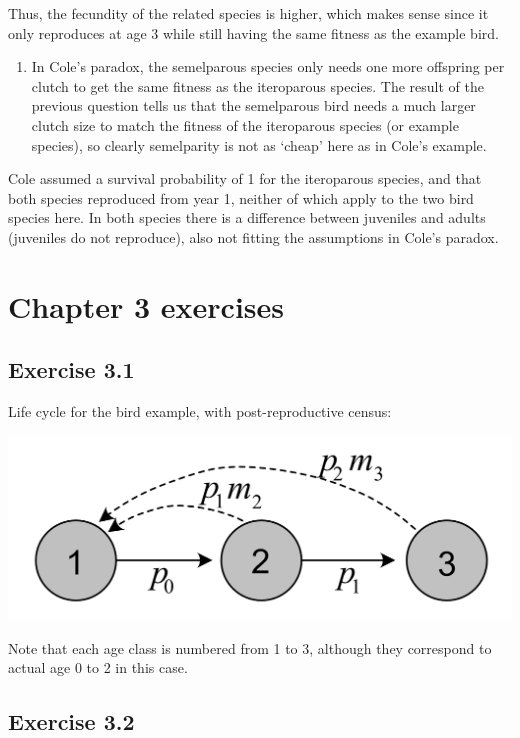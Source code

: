 \documentclass[
]{book}
\providecommand{\tightlist}{%
  \setlength{\itemsep}{0pt}\setlength{\parskip}{0pt}}
\begin{document}
Thus, the fecundity of the related species is higher, which makes sense since it only reproduces at age 3 while still having the same fitness as the example bird.

\begin{enumerate}
\def\labelenumi{\arabic{enumi}.}
\setcounter{enumi}{4}
\tightlist
\item
  In Cole's paradox, the semelparous species only needs one more offspring per clutch to get the same fitness as the iteroparous species. The result of the previous question tells us that the semelparous bird needs a much larger clutch size to match the fitness of the iteroparous species (or example species), so clearly semelparity is not as `cheap' here as in Cole's example.
\end{enumerate}

Cole assumed a survival probability of 1 for the iteroparous species, and that both species reproduced from year 1, neither of which apply to the two bird species here. In both species there is a difference between juveniles and adults (juveniles do not reproduce), also not fitting the assumptions in Cole's paradox.

\hypertarget{chapter-3-exercises}{%
\section{Chapter 3 exercises}\label{chapter-3-exercises}}

\hypertarget{exercise-3.1-1}{%
\subsection*{Exercise 3.1}\label{exercise-3.1-1}}

Life cycle for the bird example, with post-reproductive census:

\includegraphics[width=0.6\linewidth]{LifeCycleAgePost}

Note that each age class is numbered from 1 to 3, although they correspond to actual age 0 to 2 in this case.

\hypertarget{exercise-3.2-1}{%
\subsection*{Exercise 3.2}\label{exercise-3.2-1}}
\end{document}
